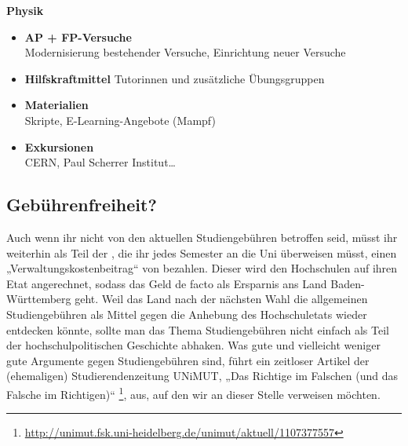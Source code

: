 \textbf{Physik}
\begin{itemize}
\item \textbf{\gls{AP} + \gls{FP}-Versuche}\\
	Modernisierung bestehender Versuche, Einrichtung neuer Versuche
\item \textbf{Hilfskraftmittel}
	Tutorinnen und zusätzliche Übungsgruppen
\item \textbf{Materialien}\\
	Skripte, E-Learning-Angebote (Mampf)
\item \textbf{Exkursionen}\\
	CERN, Paul Scherrer Institut\dots
\end{itemize}


\subsection{Gebührenfreiheit?}
Auch wenn ihr nicht von den aktuellen Studiengebühren betroffen seid, müsst ihr weiterhin als Teil der \EUR{\beitragssumme}, die ihr jedes Semester an die Uni überweisen müsst, einen „Verwaltungskostenbeitrag“ von \EUR{\verwaltungsbetrag} bezahlen. Dieser wird den Hochschulen auf ihren Etat angerechnet, sodass das Geld de facto als Ersparnis ans Land Baden-Württemberg geht. Weil das Land nach der nächsten Wahl die allgemeinen Studiengebühren als Mittel gegen die Anhebung des Hochschuletats wieder entdecken könnte, sollte man das Thema Studiengebühren nicht einfach als Teil der hochschulpolitischen Geschichte abhaken. Was gute und vielleicht weniger gute Argumente gegen Studiengebühren sind, führt ein zeitloser Artikel der (ehemaligen) Studierendenzeitung UNiMUT, „Das Richtige im Falschen (und das Falsche im Richtigen)“  \footnote{\url{http://unimut.fsk.uni-heidelberg.de/unimut/aktuell/1107377557}}, aus, auf den wir an dieser Stelle verweisen möchten.




